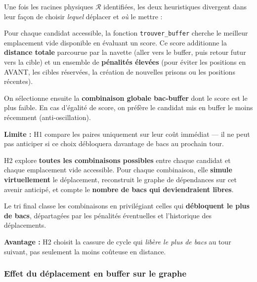 \documentclass[12pt,a4paper]{article}
\begin{document}
Une fois les racines physiques $\mathcal{R}$ identifiées, les deux
heuristiques divergent dans leur façon de choisir \emph{lequel} déplacer
et \emph{où} le mettre :

\begin{tcolorbox}[colback=gris, colframe=bleuH1, fonttitle=\bfseries,
                  title=H1 — Sélection par score de coût statique]
Pour chaque candidat accessible, la fonction
\texttt{trouver\_buffer} cherche le meilleur emplacement vide disponible en évaluant un score.
Ce score additionne la \textbf{distance totale} parcourue par la navette (aller vers le buffer, puis retour futur vers la cible)
et un ensemble de \textbf{pénalités élevées} (pour éviter les positions en AVANT, les cibles réservées, la création de nouvelles prisons ou les positions récentes).

On sélectionne ensuite la \textbf{combinaison globale bac-buffer} dont le
score est le plus faible. En cas d'égalité de score, on préfère le candidat
mis en buffer le moins récemment (anti-oscillation).

\textbf{Limite :} H1 compare les paires uniquement sur leur coût
immédiat — il ne peut pas anticiper si ce choix débloquera
davantage de bacs au prochain tour.
\end{tcolorbox}

\begin{tcolorbox}[colback=gris, colframe=vertH2, fonttitle=\bfseries,
                  title=H2 — Sélection par simulation exhaustive]
H2 explore \textbf{toutes les combinaisons possibles} entre chaque candidat et chaque emplacement vide accessible. Pour chaque combinaison,
elle \textbf{simule virtuellement} le déplacement,
reconstruit le graphe de dépendances sur cet avenir anticipé, et compte le \textbf{nombre de bacs qui deviendraient libres}.

Le tri final classe les combinaisons en privilégiant celles qui \textbf{débloquent le plus de bacs},
départagées par les pénalités éventuelles et l'historique des déplacements.

\textbf{Avantage :} H2 choisit la cassure de cycle qui
\emph{libère le plus de bacs} au tour suivant, pas seulement la moins
coûteuse en distance.
\end{tcolorbox}

\subsubsection{Effet du déplacement en buffer sur le graphe}
\end{document}
